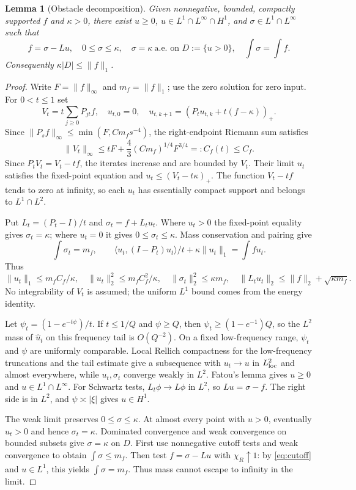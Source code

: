 \documentclass[11pt,a4paper]{article}
\newtheorem{lemma}[theorem]{Lemma}
\theoremstyle{remark}\newtheorem{remark}[theorem]{Remark}
\newcommand{\1}{\mathbf1}\newcommand{\pos}[1]{(#1)_+}
\begin{document}
\begin{lemma}[Obstacle decomposition]\label{lem:obstacle}
Given nonnegative, bounded, compactly supported $f$ and $\kappa>0$, there exist $u\ge0$,
$u\in L^1\cap L^\infty\cap H^1$, and $\sigma\in L^1\cap L^\infty$ such that
\begin{equation}\label{eq:obstacle}
 f=\sigma-Lu,\quad 0\le\sigma\le\kappa,\quad
 \sigma=\kappa\ \text{a.e. on }D:=\{u>0\},\quad \int\sigma=\int f.
\end{equation}
Consequently $\kappa|D|\le\|f\|_1$.
\end{lemma}
\begin{proof}
Write $F=\|f\|_\infty$ and $m_f=\|f\|_1$; use the zero solution for zero input. For $0<t\le1$ set
\[
 V_t=t\sum_{j\ge0}P_{jt}f,
 \quad u_{t,0}=0,\quad u_{t,k+1}=\pos{P_tu_{t,k}+t(f-\kappa)}.
\]
Since $\|P_sf\|_\infty\le\min(F,Cm_fs^{-4})$, the right-endpoint Riemann sum satisfies
\[
 \|V_t\|_\infty\le tF+\frac43(Cm_f)^{1/4}F^{3/4}=:C_f(t)\le C_f.
\]
Since $P_tV_t=V_t-tf$, the iterates increase and are bounded by $V_t$. Their limit $u_t$ satisfies the fixed-point equation and $u_t\le(V_t-t\kappa)_+$. The function $V_t-tf$ tends to zero at infinity, so each $u_t$ has essentially compact support and belongs to $L^1\cap L^2$.

Put $L_t=(P_t-I)/t$ and $\sigma_t=f+L_tu_t$. Where $u_t>0$ the fixed-point equality gives $\sigma_t=\kappa$; where $u_t=0$ it gives $0\le\sigma_t\le\kappa$. Mass conservation and pairing give
\[
 \int\sigma_t=m_f,\qquad
 \langle u_t,(I-P_t)u_t\rangle/t+\kappa\|u_t\|_1=\int f u_t.
\]
Thus
\[
 \|u_t\|_1\le m_f C_f/\kappa,\quad
 \|u_t\|_2^2\le m_f C_f^2/\kappa,\quad
 \|\sigma_t\|_2^2\le\kappa m_f,\quad
 \|L_tu_t\|_2\le\|f\|_2+\sqrt{\kappa m_f}.
\]
No integrability of $V_t$ is assumed; the uniform $L^1$ bound comes from the energy identity.

Let $\psi_t=(1-e^{-t\psi})/t$. If $t\le1/Q$ and $\psi\ge Q$, then $\psi_t\ge(1-e^{-1})Q$, so the $L^2$ mass of $\widehat u_t$ on this frequency tail is $O(Q^{-2})$. On a fixed low-frequency range, $\psi_t$ and $\psi$ are uniformly comparable. Local Rellich compactness for the low-frequency truncations and the tail estimate give a subsequence with $u_t\to u$ in $L^2_{\rm loc}$ and almost everywhere, while $u_t,\sigma_t$ converge weakly in $L^2$. Fatou's lemma gives $u\ge0$ and $u\in L^1\cap L^\infty$. For Schwartz tests, $L_t\phi\to L\phi$ in $L^2$, so $Lu=\sigma-f$. The right side is in $L^2$, and $\psi\asymp|\xi|$ gives $u\in H^1$.

The weak limit preserves $0\le\sigma\le\kappa$. At almost every point with $u>0$, eventually $u_t>0$ and hence $\sigma_t=\kappa$. Dominated convergence and weak convergence on bounded subsets give $\sigma=\kappa$ on $D$. First use nonnegative cutoff tests and weak convergence to obtain $\int\sigma\le m_f$. Then test $f=\sigma-Lu$ with $\chi_R\uparrow1$: by \eqref{eq:cutoff} and $u\in L^1$, this yields $\int\sigma=m_f$. Thus mass cannot escape to infinity in the limit.
\end{proof}
\end{document}
